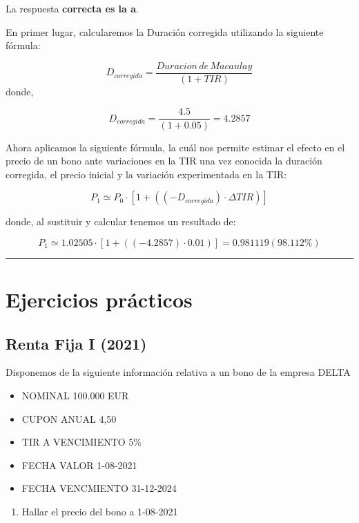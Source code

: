 \documentclass[
  letterpaper,
  DIV=11,
  numbers=noendperiod]{scrreprt}
\providecommand{\tightlist}{%
  \setlength{\itemsep}{0pt}\setlength{\parskip}{0pt}}\usepackage{longtable,booktabs,array}
\begin{document}
\begin{tcolorbox}
\begin{tcolorbox}[enhanced jigsaw, toprule=.15mm, left=2mm, arc=.35mm, breakable, bottomrule=.15mm, opacityback=0, rightrule=.15mm, leftrule=.75mm, colframe=quarto-callout-note-color-frame, colback=white]
\begin{minipage}[t]{\textwidth - 5.5mm}
La respuesta \textbf{correcta es la a}.

En primer lugar, calcularemos la Duración corregida utilizando la
siguiente fórmula:

\[D_{corregida}=\frac{Duracion\,de\, Macaulay}{\left(1+TIR\right)}\]
donde,

\[D_{corregida}=\frac{4.5}{(1+0.05)}=4.2857\]

Ahora aplicamos la siguiente fórmula, la cuál nos permite estimar el
efecto en el precio de un bono ante variaciones en la TIR una vez
conocida la duración corregida, el precio inicial y la variación
experimentada en la TIR:

\[P_1\simeq P_0\cdot\left[1+((-D_{corregida})\cdot\Delta TIR)\right]\]

donde, al sustituir y calcular tenemos un resultado de:

\[P_1\simeq 1.02505\cdot\left[1+((-4.2857)\cdot 0.01)\right]=0.981119(98.112\%)\]

\end{minipage}%
\end{tcolorbox}

\begin{center}\rule{0.5\linewidth}{0.5pt}\end{center}

\section{Ejercicios prácticos}\label{ejercicios-pruxe1cticos}

\subsection{Renta Fija I (2021)}\label{renta-fija-i-2021}

Disponemos de la siguiente información relativa a un bono de la empresa
DELTA

\begin{itemize}
\tightlist
\item
  NOMINAL 100.000 EUR
\item
  CUPON ANUAL 4,50
\item
  TIR A VENCIMIENTO 5\%
\item
  FECHA VALOR 1-08-2021
\item
  FECHA VENCMIENTO 31-12-2024
\end{itemize}

\begin{enumerate}
\def\labelenumi{\arabic{enumi}.}
\tightlist
\item
  Hallar el precio del bono a 1-08-2021
\end{enumerate}


\end{tcolorbox}
\end{document}
